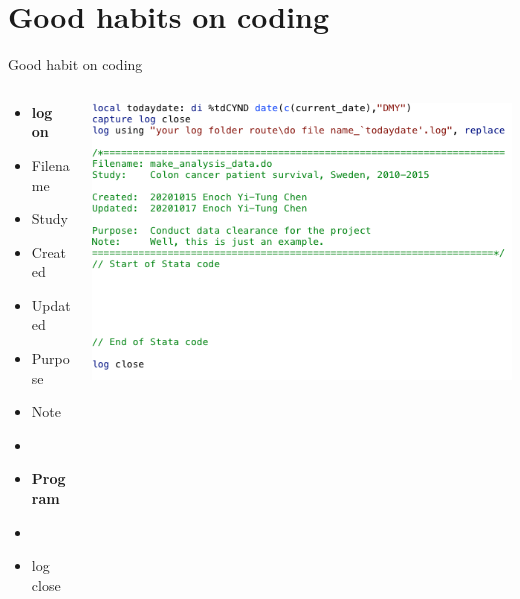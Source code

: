 \section{Good habits on coding}
\begin{frame}[allowframebreaks]{Good habit on coding}
\begin{columns}
	\begin{column}{0.3\textwidth} 
	\begin{itemize}
	\item \textbf{log on}
	\item Filename
	\item Study
	\item Created
	\item Updated
	\item Purpose
	\item Note
	\item[] 
	\item \textbf{Program}
	\item[] 
	\item log close
	\end{itemize}
	\end{column}
	
	\begin{column}{0.7\textwidth} 
			\includegraphics[scale=0.5]{image/header}
	\end{column}

\end{columns}

\newpage


\end{frame}
